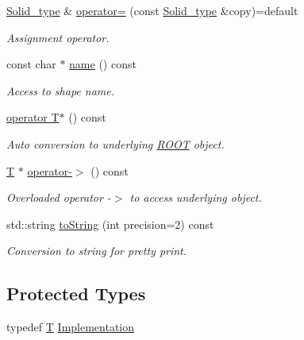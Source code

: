 \begin{DoxyCompactItemize}
\hyperlink{class_d_d4hep_1_1_geometry_1_1_solid__type}{Solid\+\_\+type} \& \hyperlink{class_d_d4hep_1_1_geometry_1_1_solid__type_a184c61e7d41ab0a178100d4b088306fc}{operator=} (const \hyperlink{class_d_d4hep_1_1_geometry_1_1_solid__type}{Solid\+\_\+type} \&copy)=default
\begin{DoxyCompactList}\small\item\em Assignment operator. \end{DoxyCompactList}\item 
const char $\ast$ \hyperlink{class_d_d4hep_1_1_geometry_1_1_solid__type_a2a8748c719b40f18385b481d4645417f}{name} () const
\begin{DoxyCompactList}\small\item\em Access to shape name. \end{DoxyCompactList}\item 
\hyperlink{class_d_d4hep_1_1_geometry_1_1_solid__type_a58acff0e20e5b149236c2eee1f5ec19d}{operator T$\ast$} () const
\begin{DoxyCompactList}\small\item\em Auto conversion to underlying \hyperlink{namespace_r_o_o_t}{R\+O\+OT} object. \end{DoxyCompactList}\item 
\hyperlink{class_t}{T} $\ast$ \hyperlink{class_d_d4hep_1_1_geometry_1_1_solid__type_a9efc04a0a590c911de79def1b5e3b630}{operator-\/$>$} () const
\begin{DoxyCompactList}\small\item\em Overloaded operator -\/$>$ to access underlying object. \end{DoxyCompactList}\item 
std\+::string \hyperlink{class_d_d4hep_1_1_geometry_1_1_solid__type_a670931e69f6f3dbf1a916e2ba2dd42d6}{to\+String} (int precision=2) const
\begin{DoxyCompactList}\small\item\em Conversion to string for pretty print. \end{DoxyCompactList}\end{DoxyCompactItemize}
\subsection*{Protected Types}
\begin{DoxyCompactItemize}
\item 
typedef \hyperlink{class_t}{T} \hyperlink{class_d_d4hep_1_1_geometry_1_1_solid__type_a660e91d2703f947ad759fe0cbef3bbc6}{Implementation}
\end{DoxyCompactItemize}
